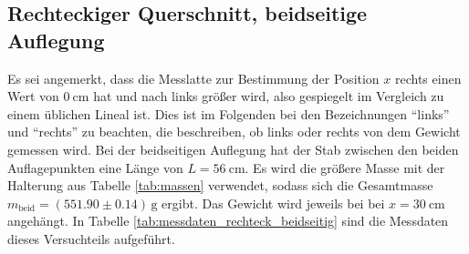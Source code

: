 \subsection{Rechteckiger Querschnitt, beidseitige Auflegung}
\label{sec:rechteck_beidseitig}
Es sei angemerkt, dass die Messlatte zur Bestimmung der Position $x$ rechts einen Wert von $\qty{0}{\cm}$ hat und nach links größer wird,
also gespiegelt im Vergleich zu einem üblichen Lineal ist. 
Dies ist im Folgenden bei den Bezeichnungen \enquote{links} und \enquote{rechts} zu beachten, die beschreiben, ob links oder rechts von dem Gewicht gemessen wird.
Bei der beidseitigen Auflegung hat der Stab zwischen den beiden Auflagepunkten eine Länge von $L = \qty{56}{\cm}$.
Es wird die größere Masse mit der Halterung aus Tabelle \ref{tab:massen} verwendet, sodass sich die Gesamtmasse
$m_\text{beid} = (\num{551.90} \pm \num{0.14}) \, \unit{\gram}$ ergibt.
Das Gewicht wird jeweils bei bei $x = \qty{30}{\cm}$ angehängt.
In Tabelle \ref{tab:messdaten_rechteck_beidseitig} sind die Messdaten dieses Versuchteils aufgeführt.
